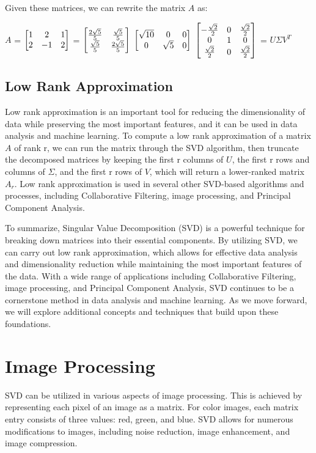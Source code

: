 \documentclass[12pt]{article}
\begin{document}
Given these matrices, we can rewrite the matrix $A$ as:

\begin{center}
    
$A$ = $\begin{bmatrix}
1 &  2  & 1 \cr
2 & -1 & 2 \cr
\end{bmatrix}$ =
$\begin{bmatrix}
\frac{2 \sqrt{5}}{5} & \frac{\sqrt{5}}{5}\cr
\frac{ \sqrt{5}}{5} & \frac{2 \sqrt{5}}{5} \cr
\end{bmatrix}$
$\begin{bmatrix}
\sqrt{10} & 0 & 0 \cr
0 & \sqrt{5} & 0 \cr
\end{bmatrix}$
$\begin{bmatrix}
-\frac{\sqrt{2}}{2} & 0 &  \frac{\sqrt{2}}{2}\cr
0 & 1 & 0\cr
\frac{\sqrt{2}}{2} & 0 & \frac{\sqrt{2}}{2} \cr
\end{bmatrix}$
= $U\Sigma V^T$
\end{center}

\subsection{Low Rank Approximation}
Low rank approximation is an important tool for reducing the dimensionality of data while preserving the most important features, and it can be used in data analysis and machine learning. To compute a low rank approximation of a matrix $A$ of rank r, we can run the matrix through the SVD algorithm, then truncate the decomposed matrices by keeping the first r columns of $U$, the first r rows and columns of $\Sigma$, and the first r rows of $V$, which will return a lower-ranked matrix $A_r$. Low rank approximation is used in several other SVD-based algorithms and processes, including Collaborative Filtering, image processing, and Principal Component Analysis.

To summarize, Singular Value Decomposition (SVD) is a powerful technique for breaking down matrices into their essential components. By utilizing SVD, we can carry out low rank approximation, which allows for effective data analysis and dimensionality reduction while maintaining the most important features of the data. With a wide range of applications including Collaborative Filtering, image processing, and Principal Component Analysis, SVD continues to be a cornerstone method in data analysis and machine learning. As we move forward, we will explore additional concepts and techniques that build upon these foundations.
\newpage
\section{Image Processing}
SVD can be utilized in various aspects of image processing. This is achieved by representing each pixel of an image as a matrix. For color images, each matrix entry consists of three values: red, green, and blue. SVD allows for numerous modifications to images, including noise reduction, image enhancement, and image compression.
\end{document}
